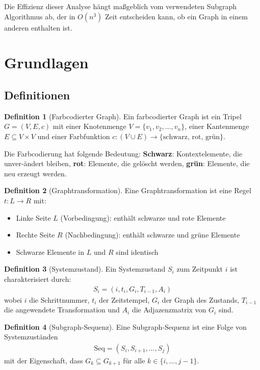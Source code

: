 \documentclass[a4paper,12pt]{article}
\theoremstyle{definition}
\newtheorem{definition}{Definition}
\begin{document}
Die Effizienz dieser Analyse hängt maßgeblich vom verwendeten Subgraph Algorithmus ab, der in $O(n^3)$ Zeit entscheiden kann, ob ein Graph in einem anderen enthalten ist.

\section{Grundlagen}

\subsection{Definitionen}

\begin{definition}[Farbcodierter Graph]
	Ein farbcodierter Graph ist ein Tripel $G = (V, E, c)$ mit einer Knotenmenge $V = \{v_1, v_2, \ldots, v_n\}$, einer Kantenmenge $E \subseteq V \times V$ und einer Farbfunktion $c: (V \cup E) \rightarrow \{\text{schwarz, rot, grün}\}$.
\end{definition}
Die Farbcodierung hat folgende Bedeutung: \textbf{Schwarz}: Kontextelemente, die unver-ändert bleiben, \textbf{rot}: Elemente, die gelöscht werden, \textbf{grün}: Elemente, die neu erzeugt werden.

\begin{definition}[Graphtransformation]
	Eine Graphtransformation ist eine Regel $t: L \rightarrow R$ mit:
	\begin{itemize}
		\item[-] Linke Seite $L$ (Vorbedingung): enthält schwarze und rote Elemente
		\item[-] Rechte Seite $R$ (Nachbedingung): enthält schwarze und grüne Elemente
		\item[-] Schwarze Elemente in $L$ und $R$ sind identisch
	\end{itemize}
\end{definition}

\begin{definition}[Systemzustand]
	Ein Systemzustand $S_i$ zum Zeitpunkt $i$ ist charakterisiert durch:
	\begin{align*}
		S_i = (i, t_i, G_i, T_{i-1}, A_i)
	\end{align*}
	wobei $i$ die Schrittnummer, $t_i$ der Zeitstempel, $G_i$ der Graph des Zustands, $T_{i-1}$ die angewendete Transformation und $A_i$ die Adjazenzmatrix von $G_i$ sind.
\end{definition}

\begin{definition}[Subgraph-Sequenz]
	Eine Subgraph-Sequenz ist eine Folge von Systemzuständen
	\begin{align*}
		\text{Seq} = (S_{i}, S_{i+1}, \ldots, S_{j})
	\end{align*}
	mit der Eigenschaft, dass $G_k \subseteq G_{k+1}$ für alle $k \in \{i, \ldots, j-1\}$.
\end{definition}
\end{document}
